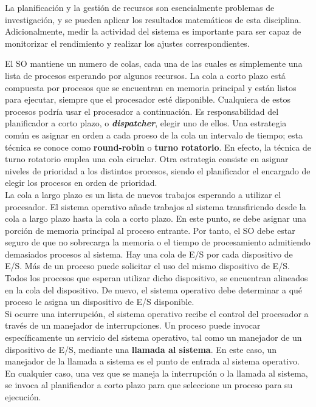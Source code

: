 \documentclass{article}
\begin{document}
				La planificación y la gestión de recursos son esencialmente problemas de investigación, y se pueden aplicar los resultados matemáticos de esta disciplina. Adicionalmente, medir la actividad del sistema es importante para ser capaz de monitorizar el rendimiento y realizar los ajustes correspondientes.	
				
				El SO mantiene un numero de colas, cada una de las cuales es simplemente una lista de procesos esperando por algunos recursos. La cola a corto plazo está compuesta por procesos que se encuentran en memoria principal y están listos para ejecutar, siempre que el procesador esté disponible. Cualquiera de estos procesos podría usar el procesador a continuación. Es responsabilidad del planificador a corto plazo, o \textbf{\textit{dispatcher}}, elegir uno de ellos. Una estrategia común es asignar en orden a cada proeso de la cola un intervalo de tiempo; esta técnica se conoce como \textbf{round-robin} o \textbf{turno rotatorio}. En efecto, la técnica de turno rotatorio emplea una cola ciruclar. Otra estrategia consiste en asignar niveles de prioridad a los distintos procesos, siendo el planificador el encargado de elegir los procesos en orden de prioridad. \\
				
				La cola a largo plazo es un lista de nuevos trabajos esperando a utilizar el procesador. El sistema operativo añade trabajos al sistema transfiriendo desde la cola a largo plazo hasta la cola a corto plazo. En este punto, se debe asignar una porción de memoria principal al proceso entrante. Por tanto, el SO debe estar seguro de que no sobrecarga la memoria o el tiempo de procesamiento admitiendo demasiados procesos al sistema. Hay una cola de E/S por cada dispositivo de E/S. Más de un proceso puede solicitar el uso del mismo dispositivo de E/S. Todos los procesos que esperan utilizar dicho dispositivo, se encuentran alineados en la cola del dispositivo. De nuevo, el sistema operativo debe determinar a qué proceso le asigna un dispositivo de E/S disponible. \\
				
				Si ocurre una interrupción, el sistema operativo recibe el control del procesador a través de un manejador de interrupciones. Un proceso puede invocar específicamente un servicio del sistema operativo, tal como un manejador de un dispositivo de E/S, mediante una \textbf{llamada al sistema}. En este caso, un manejador de la llamada a sistema es el punto de entrada al sistema operativo. En cualquier caso, una vez que se maneja la interrupción o la llamada al sistema, se invoca al planificador a corto plazo para que seleccione un proceso para su ejecución. \\
				
\end{document}
